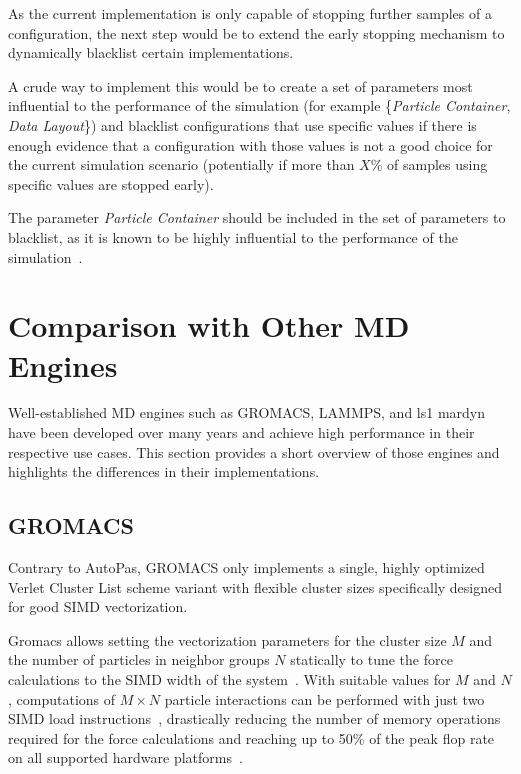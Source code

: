 \documentclass[conference]{IEEEtran}
\begin{document}
As the current implementation is only capable of stopping further samples of a configuration, the next step would be to extend the early stopping mechanism to dynamically blacklist certain implementations.

A crude way to implement this would be to create a set of parameters most influential to the performance of the simulation (for example \{\textit{Particle Container}, \textit{Data Layout}\}) and blacklist configurations that use specific values if there is enough evidence that a configuration with those values is not a good choice for the current simulation scenario (potentially if more than $X$\% of samples using specific values are stopped early).

The parameter \textit{Particle Container} should be included in the set of parameters to blacklist, as it is known to be highly influential to the performance of the simulation~\cite{Gratl2019AutoPas}.


\newpage
\newpage


\section{Comparison with Other MD Engines}

Well-established MD engines such as GROMACS, LAMMPS, and ls1 mardyn have been developed over many years and achieve high performance in their respective use cases. This section provides a short overview of those engines and highlights the differences in their implementations.

\subsection{GROMACS}

Contrary to AutoPas, GROMACS only implements a single, highly optimized Verlet Cluster List scheme variant with flexible cluster sizes specifically designed for good SIMD vectorization.

Gromacs allows setting the vectorization parameters for the cluster size $M$ and the number of particles in neighbor groups $N$ statically to tune the force calculations to the SIMD width of the system~\cite{PALL20132641}. With suitable values for $M$ and $N$, computations of $M \times N$ particle interactions can be performed with just two SIMD load instructions~\cite{Solving_Software_Challenges_Exascale_2014}, drastically reducing the number of memory operations required for the force calculations and reaching up to 50\% of the peak flop rate on all supported hardware platforms~\cite{Solving_Software_Challenges_Exascale_2014}.
\end{document}

